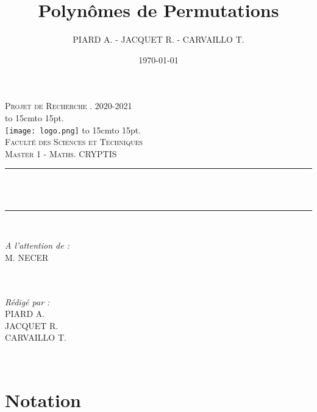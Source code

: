 \documentclass[12pt]{article}
\title{Polynômes de Permutations}
\author{PIARD A. - JACQUET R. - CARVAILLO T.}
\date{\today}
\makeatletter
\let\thetitle\@title
\def\dotfill#1{\cleaders\hbox to #1{.}\hfill}
\newcommand\dotline[2][.5em]{\leavevmode\hbox to #2{\dotfill{#1}\hfil}}
\theoremstyle{remark}\newtheorem{note}{Note}
\theoremstyle{remark}\newtheorem{nota}{Notation}
\theoremstyle{definition}
\makeatother
\begin{document}

\begin{titlepage}
	\centering
    \vspace*{0.5 cm}
    \textsc{\LARGE Projet de Recherche . 2020-2021}\\[1.0 cm]
    \dotline[15pt]{15cm}\\
	\texttt{[image: logo.png]}
	\dotline[15pt]{15cm}\\
	\vspace{1.5cm}
	\textsc{\Large Faculté des Sciences et Techniques}\\
	\textsc{\large Master 1 - Maths. CRYPTIS}\\[1.0 cm]
	\rule{\linewidth}{0.2 mm} \\[0.4 cm]
	{ \huge \bfseries \color{blue} \thetitle}\\
	\rule{\linewidth}{0.2 mm} \\[1.5 cm]
	
	\begin{minipage}{0.4\textwidth}
		\begin{flushleft} \large
			\emph{A l'attention de :}\\
			M. NECER\\
			\phantom{a}\\
			\phantom{a}\\
		\end{flushleft}
	\end{minipage}
	\begin{minipage}{0.5\textwidth}
    	\begin{flushright} \large
		\emph{Rédigé par :}\\
		PIARD A.\\
		JACQUET R.\\
		CARVAILLO T.\\
		\end{flushright}
	\end{minipage}\\[2 cm]
\end{titlepage}


\tableofcontents
\pagebreak
\section*{\Huge Notation}
\end{document}
